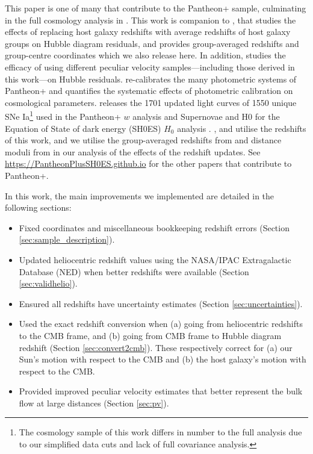 \documentclass[
  journal=pasa,
  manuscript=research-paper,
  year=2022,
]{cup-journal}
\newcommand{\papers}{\url{https://PantheonPlusSH0ES.github.io}}
\begin{document}
This paper is one of many that contribute to the Pantheon+ sample, culminating in the full cosmology analysis in \citet{Brout2022cosmo}.
This work is companion to \citet{Peterson2021}, that studies the effects of replacing host galaxy redshifts with average redshifts of host galaxy groups on Hubble diagram residuals, and provides group-averaged redshifts and group-centre coordinates which we also release here.
In addition, \citet{Peterson2021} studies the efficacy of using different peculiar velocity samples---including those derived in this work---on Hubble residuals.
\citet{Brout2022cals} re-calibrates the many photometric systems of Pantheon+ and quantifies the systematic effects of photometric calibration on cosmological parameters.
\citet{Scolnic2022samples} releases the 1701 updated light curves of 1550 unique SNe Ia\footnote{The cosmology sample of this work differs in number to the full analysis due to our simplified data cuts and lack of full covariance analysis.} used in the Pantheon+ $w$ analysis and Supernovae and H0 for the Equation of State of dark energy (SH0ES) $H_0$ analysis \citep{Riess2022}.
\citet{Peterson2021}, \citet{Scolnic2022samples} and \cite{Brout2022cals, Brout2022cosmo} utilise the redshifts of this work, and we utilise the group-averaged redshifts from \citet{Peterson2021} and distance moduli from \citet{Brout2022cosmo} in our analysis of the effects of the redshift updates.
See \papers{} for the other papers that contribute to Pantheon+.

In this work, the main improvements we implemented are detailed in the following sections: 
\begin{itemize}
    \item Fixed coordinates and miscellaneous bookkeeping redshift errors (Section \ref{sec:sample_description}).
    \item Updated heliocentric redshift values using the NASA/IPAC Extragalactic Database (NED) when better redshifts were available (Section \ref{sec:validhelio}).
    \item Ensured all redshifts have uncertainty estimates (Section \ref{sec:uncertainties}).
    \item Used the exact redshift conversion when (a) going from heliocentric redshifts to the CMB frame, and (b) going from CMB frame to Hubble diagram redshift (Section \ref{sec:convert2cmb}).
These respectively correct for (a) our Sun's motion with respect to the CMB and (b) the host galaxy's motion with respect to the CMB.
    \item Provided improved peculiar velocity estimates that better represent the bulk flow at large distances (Section \ref{sec:pv}).
\end{itemize}
\end{document}
